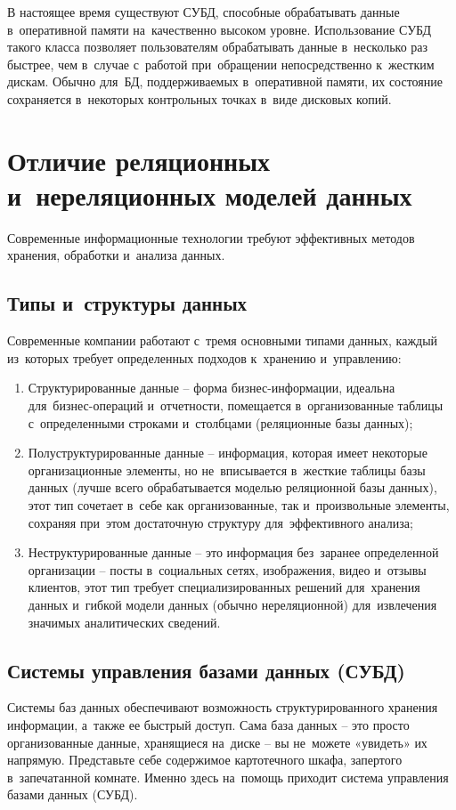 \documentclass{ou}
\begin{document}
В настоящее время существуют СУБД, способные обрабатывать данные в~оперативной памяти на~качественно высоком уровне. Использование СУБД такого класса позволяет пользователям обрабатывать данные в~несколько раз быстрее, чем в~случае с~работой при~обращении непосредственно к~жестким дискам. Обычно для~БД, поддерживаемых в~оперативной памяти, их состояние сохраняется в~некоторых контрольных точках в~виде дисковых копий.
\newpage
\section{Отличие реляционных и~нереляционных моделей данных}
Современные информационные технологии требуют эффективных методов хранения, обработки и~анализа данных.
\subsection{Типы и~структуры данных}
Современные компании работают с~тремя основными типами данных, каждый из~которых требует определенных подходов к~хранению и~управлению:
\begin{enumerate}[itemindent=4em, nosep, label=\arabic*)]
\item Структурированные данные -- форма бизнес-информации, идеальна для~бизнес-операций и~отчетности, помещается в~организованные таблицы с~определенными строками и~столбцами (реляционные базы данных);
\item Полуструктурированные данные -- информация, которая имеет некоторые организационные элементы, но не~вписывается в~жесткие таблицы базы данных (лучше всего обрабатывается моделью реляционной базы данных), этот тип сочетает в~себе как организованные, так и~произвольные элементы, сохраняя при~этом достаточную структуру для~эффективного анализа;
\item Неструктурированные данные -- это информация без~заранее определенной организации -- посты в~социальных сетях, изображения, видео и~отзывы клиентов, этот тип требует специализированных решений для~хранения данных и~гибкой модели данных (обычно нереляционной) для~извлечения значимых аналитических сведений.
\end{enumerate}
\subsection{Системы управления базами данных (СУБД)}
Системы баз данных обеспечивают возможность структурированного хранения информации, а~также ее быстрый доступ. Сама база данных -- это просто организованные данные, хранящиеся на~диске -- вы не~можете «увидеть» их напрямую. Представьте себе содержимое картотечного шкафа, запертого в~запечатанной комнате. Именно здесь на~помощь приходит система управления базами данных (СУБД).
\end{document}
